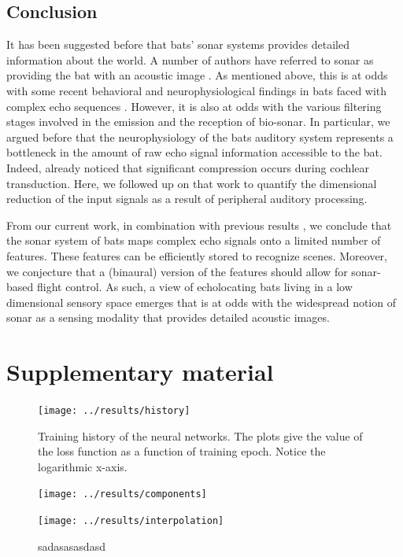 \documentclass[preprint,5p]{elsarticle}
\begin{document}
\subsection{Conclusion}

It has been suggested before that bats' sonar systems provides detailed information about the world. A number of authors have referred to sonar as providing the bat with an acoustic image \citep{Lee2017,Barchi2013,Moss2001,Schnitzler2003,Simmons2012,Ulanovsky2008,Clare2015,Surlykke2016,Geipel2013}. As mentioned above, this is at odds with some recent behavioral and neurophysiological findings in bats faced with complex echo sequences \citep{Knowles2015,Geberl2013,Warnecke2018}. However, it is also at odds with the various filtering stages involved in the emission and the reception of bio-sonar. In particular, we argued before that the neurophysiology of the  bats auditory system represents a bottleneck in the amount of raw echo signal information accessible to the bat. Indeed, \citet{Reijniers2010a} already noticed that significant compression occurs during cochlear transduction. Here, we followed up on that work to quantify the dimensional reduction of the input signals as a result of peripheral auditory processing.

From our current work, in combination with previous results \citep{Vanderelst2016,Vanderelst2015a,Mansour2019,Reijniers2010a}, we conclude that the sonar system of bats maps complex echo signals onto a limited number of features. These features can be efficiently stored to recognize scenes. Moreover, we conjecture that a (binaural) version of the features should allow for sonar-based flight control. As such, a view of echolocating bats living in a low dimensional sensory space emerges that is at odds with the widespread notion of sonar as a sensing modality that provides detailed acoustic images.



\onecolumn
\appendix
\section{Supplementary material}

\begin{figure}[h]
	\centering
	\texttt{[image: ../results/history]}
	\caption{Training history of the neural networks. The plots give the value of the loss function as a function of training epoch. Notice the logarithmic x-axis.}
	\label{fig:history}
\end{figure}

\begin{figure}[h]
	\centering
	\texttt{[image: ../results/components]}
	\caption{}
	\label{fig:components}
\end{figure}

\begin{figure}[h]
	\centering
	\texttt{[image: ../results/interpolation]}
	\caption{sadasasasdasd}
	\label{fig:interpolation}
\end{figure}
\end{document}
